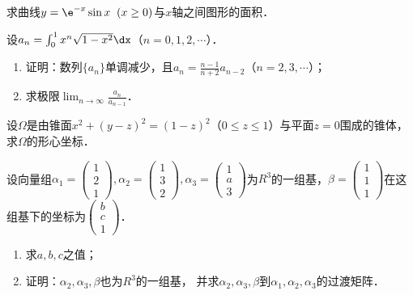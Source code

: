 \documentclass[plain,noanswer,medmath]{../../template/jnuexam}
\begin{document}
\begin{problem}[points=10]
求曲线$y = \e^{- x}\sin x\;\;(x \ge 0)$与$x$轴之间图形的面积．
\end{problem}


\begin{problem}[points=10]
设$a_n = \int_0^1 x^n\sqrt{1 - x^2} \dx$（$n = 0,1,2, \cdots$）．
\begin{enumerate}
\item 证明：数列$\{a_n\}$单调减少，且$a_n = \frac{n - 1}{n + 2}a_{n - 2}$（$n = 2,3, \cdots$）；
\item 求极限$\lim_{n \to \infty} \frac{a_n}{a_{n - 1}}$．
\end{enumerate}
\end{problem}


\begin{problem}[points=10]
设$\Omega$是由锥面$x^2 + (y - z)^2 = (1 - z)^2$（$0 \le z \le 1$）与平面$z = 0$围成的锥体，
求$\Omega$的形心坐标．
\end{problem}


\begin{problem}[points=11]
设向量组$\alpha_1 = \begin{pmatrix}
  1 \\
  2 \\
  1
\end{pmatrix},\alpha_2 = \begin{pmatrix}
  1 \\
  3 \\
  2
\end{pmatrix},\alpha_3 = \begin{pmatrix}
  1 \\
  a \\
  3
\end{pmatrix}$为$R^3$的一组基，$\beta = \begin{pmatrix}
  1 \\
  1 \\
  1
\end{pmatrix}$在这组基下的坐标为$\begin{pmatrix}
  b \\
  c \\
  1
\end{pmatrix}$．
\begin{enumerate}
\item 求$a,b,c$之值；
\item 证明：$\alpha_2,\alpha_3,\beta$也为$R^3$的一组基，
      并求$\alpha_2,\alpha_3,\beta$到$\alpha_1,\alpha_2,\alpha_3$的过渡矩阵．
\end{enumerate}
\end{problem}
\end{document}
